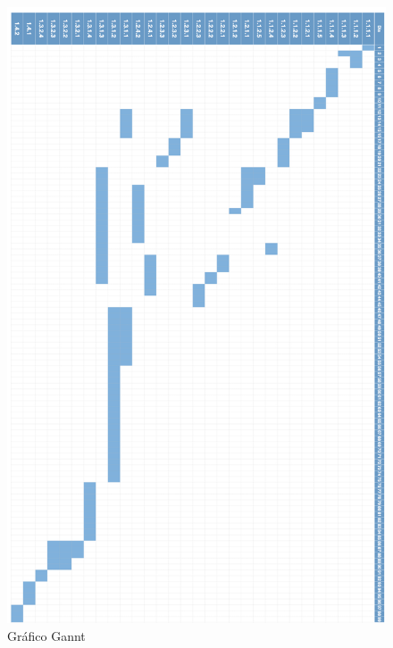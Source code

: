 \documentclass[a4paper,11pt]{article}
\begin{document}
    	\begin{figure}[!H]
    		\centering
        	\includegraphics[width=\textwidth,height=\dimexpr\textheight-3\baselineskip\relax,keepaspectratio]{gannt.png}
        	\caption{Gráfico Gannt}
     		\label{gannt}
    	\end{figure}
\end{document}
